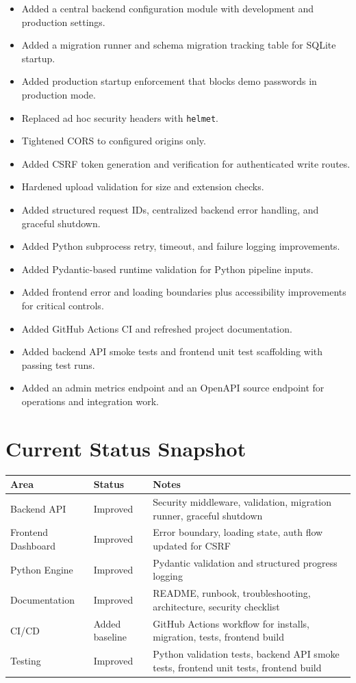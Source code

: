 \documentclass[12pt,a4paper]{report}
\begin{document}
\begin{itemize}
  \item Added a central backend configuration module with development and production settings.
  \item Added a migration runner and schema migration tracking table for SQLite startup.
  \item Added production startup enforcement that blocks demo passwords in production mode.
  \item Replaced ad hoc security headers with \texttt{helmet}.
  \item Tightened CORS to configured origins only.
  \item Added CSRF token generation and verification for authenticated write routes.
  \item Hardened upload validation for size and extension checks.
  \item Added structured request IDs, centralized backend error handling, and graceful shutdown.
  \item Added Python subprocess retry, timeout, and failure logging improvements.
  \item Added Pydantic-based runtime validation for Python pipeline inputs.
  \item Added frontend error and loading boundaries plus accessibility improvements for critical controls.
  \item Added GitHub Actions CI and refreshed project documentation.
  \item Added backend API smoke tests and frontend unit test scaffolding with passing test runs.
  \item Added an admin metrics endpoint and an OpenAPI source endpoint for operations and integration work.
\end{itemize}

\section{Current Status Snapshot}

\begin{longtable}{p{4.2cm}p{3cm}p{6.3cm}}
\toprule
Area & Status & Notes \\
\midrule
Backend API & Improved & Security middleware, validation, migration runner, graceful shutdown \\
Frontend Dashboard & Improved & Error boundary, loading state, auth flow updated for CSRF \\
Python Engine & Improved & Pydantic validation and structured progress logging \\
Documentation & Improved & README, runbook, troubleshooting, architecture, security checklist \\
CI/CD & Added baseline & GitHub Actions workflow for installs, migration, tests, frontend build \\
Testing & Improved & Python validation tests, backend API smoke tests, frontend unit tests, frontend build \\
\bottomrule
\end{longtable}
\end{document}
